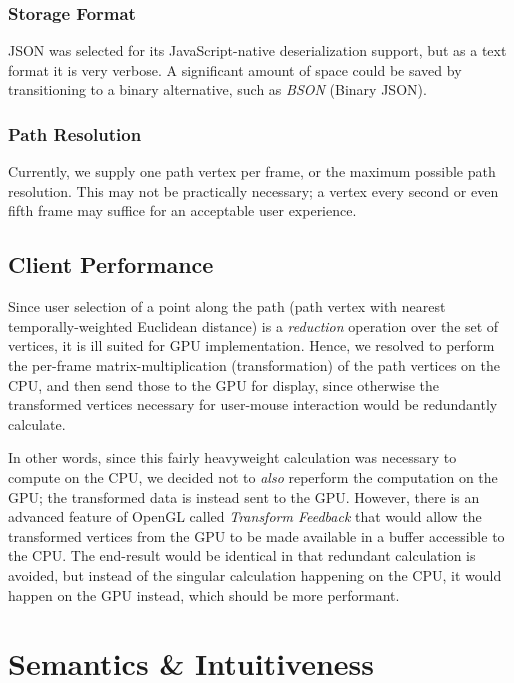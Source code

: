 \subsubsection{Storage Format}
JSON was selected for its JavaScript-native deserialization support, but as a text format it is very verbose. A significant amount of space could be saved by transitioning to a binary alternative, such as \emph{BSON} (Binary JSON).

\subsubsection{Path Resolution}
    Currently, we supply one path vertex per frame, or the maximum possible path resolution. This may not be practically necessary; a vertex every second or even fifth frame may suffice for an acceptable user experience.


\subsection{Client Performance}
Since user selection of a point along the path (path vertex with nearest temporally-weighted Euclidean distance) is a \emph{reduction} operation over the set of vertices, it is ill suited for GPU implementation. Hence, we resolved to perform the per-frame matrix-multiplication (transformation) of the path vertices on the CPU, and then send those to the GPU for display, since otherwise the transformed vertices necessary for user-mouse interaction would be redundantly calculate.\par
In other words, since this fairly heavyweight calculation was necessary to compute on the CPU, we decided not to \emph{also} reperform the computation on the GPU; the transformed data is instead sent to the GPU. However, there is an advanced feature of OpenGL called \emph{Transform Feedback} that would allow the transformed vertices from the GPU to be made available in a buffer accessible to the CPU. The end-result would be identical in that redundant calculation is avoided, but instead of the singular calculation happening on the CPU, it would happen on the GPU instead, which should be more performant.



\section{Semantics \& Intuitiveness}


